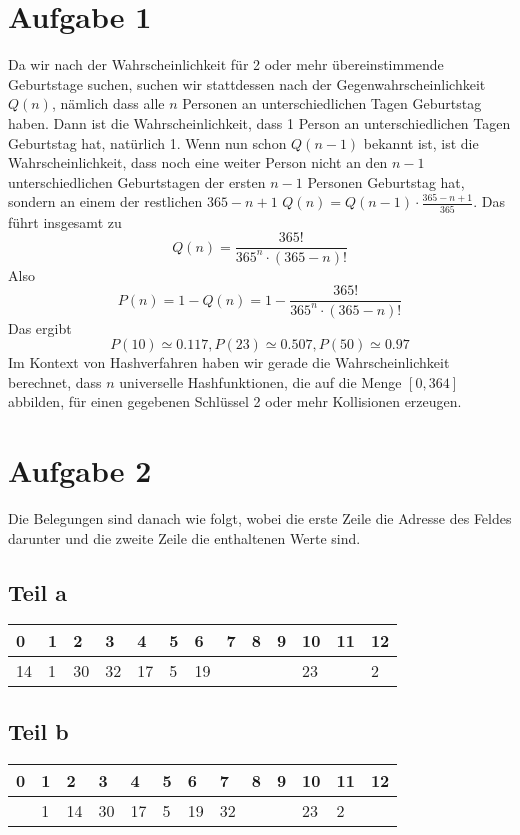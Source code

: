 \documentclass[10pt,a4paper]{article}
\begin{document}
\section{Aufgabe 1}
Da wir nach der Wahrscheinlichkeit für 2 oder mehr übereinstimmende Geburtstage suchen, suchen wir stattdessen nach der Gegenwahrscheinlichkeit $Q(n)$, nämlich dass alle $n$ Personen an unterschiedlichen Tagen Geburtstag haben.
Dann ist die Wahrscheinlichkeit, dass 1 Person an unterschiedlichen Tagen Geburtstag hat, natürlich 1.
Wenn nun schon $Q(n - 1)$ bekannt ist, ist die Wahrscheinlichkeit, dass noch eine weiter Person nicht an den $n - 1$ unterschiedlichen Geburtstagen der ersten $n - 1$ Personen Geburtstag hat, sondern an einem der restlichen $365 - n + 1$ $Q(n) = Q(n - 1) \cdot \frac{365 - n + 1}{365}$.
Das führt insgesamt zu
\begin{equation}
  Q(n) = \frac{365!}{365^{n} \cdot (365 - n)!}
\end{equation}
Also
\begin{equation}
  P(n) = 1 - Q(n) = 1 - \frac{365!}{365^{n} \cdot (365 - n)!}
\end{equation}
Das ergibt
\begin{equation}
  P(10) \simeq 0.117, P(23) \simeq 0.507, P(50) \simeq 0.97
\end{equation}
Im Kontext von Hashverfahren haben wir gerade die Wahrscheinlichkeit berechnet, dass $n$ universelle Hashfunktionen, die auf die Menge $[0, 364]$ abbilden, für einen gegebenen Schlüssel 2 oder mehr Kollisionen erzeugen.

\section{Aufgabe 2}
Die Belegungen sind danach wie folgt, wobei die erste Zeile die Adresse des Feldes darunter und die zweite Zeile die enthaltenen Werte sind.

\subsection{Teil a}
\begin{tabular}{l|l|l|l|l|l|l|l|l|l|l|l|l}
  0 & 1 & 2 & 3 & 4 & 5 & 6 & 7 & 8 & 9 & 10 & 11 & 12\\
  \hline
  14 & 1 & 30 & 32 & 17 & 5 & 19 &   &   &   & 23 &    & 2
\end{tabular}

\subsection{Teil b}
\begin{tabular}{l|l|l|l|l|l|l|l|l|l|l|l|l}
  0 & 1 & 2 & 3 & 4 & 5 & 6 & 7 & 8 & 9 & 10 & 11 & 12\\
  \hline
    & 1 & 14 & 30 & 17 & 5 & 19 & 32 &   &   & 23 & 2 & 
\end{tabular}
\end{document}
